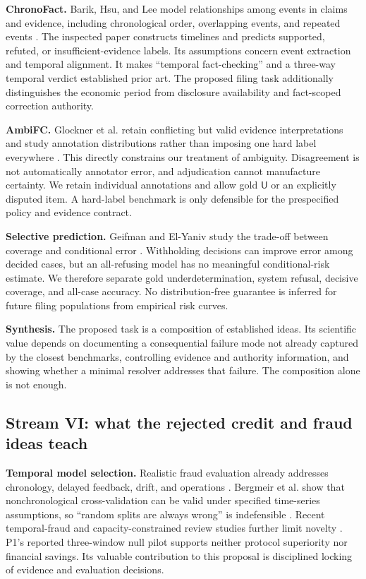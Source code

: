 \documentclass[11pt,a4paper]{article}
\newcommand{\pbreak}{\clearpage}
\newcommand{\lead}[1]{\textbf{\color{navy}#1}}
\newcommand{\Ulabel}{\mathsf{U}}
\begin{document}
\lead{ChronoFact.} Barik, Hsu, and Lee model relationships among events in claims and evidence, including chronological order, overlapping events, and repeated events \cite{chronofact}. The inspected paper constructs timelines and predicts supported, refuted, or insufficient-evidence labels. Its assumptions concern event extraction and temporal alignment. It makes “temporal fact-checking” and a three-way temporal verdict established prior art. The proposed filing task additionally distinguishes the economic period from disclosure availability and fact-scoped correction authority.

\lead{AmbiFC.} Glockner et al. retain conflicting but valid evidence interpretations and study annotation distributions rather than imposing one hard label everywhere \cite{ambifc}. This directly constrains our treatment of ambiguity. Disagreement is not automatically annotator error, and adjudication cannot manufacture certainty. We retain individual annotations and allow gold \(\Ulabel\) or an explicitly disputed item. A hard-label benchmark is only defensible for the prespecified policy and evidence contract.

\lead{Selective prediction.} Geifman and El-Yaniv study the trade-off between coverage and conditional error \cite{selective}. Withholding decisions can improve error among decided cases, but an all-refusing model has no meaningful conditional-risk estimate. We therefore separate gold underdetermination, system refusal, decisive coverage, and all-case accuracy. No distribution-free guarantee is inferred for future filing populations from empirical risk curves.

\lead{Synthesis.} The proposed task is a composition of established ideas. Its scientific value depends on documenting a consequential failure mode not already captured by the closest benchmarks, controlling evidence and authority information, and showing whether a minimal resolver addresses that failure. The composition alone is not enough.

\pbreak
\subsection{Stream VI: what the rejected credit and fraud ideas teach}
\lead{Temporal model selection.} Realistic fraud evaluation already addresses chronology, delayed feedback, drift, and operations \cite{dal2018}. Bergmeir et al. show that nonchronological cross-validation can be valid under specified time-series assumptions, so “random splits are always wrong” is indefensible \cite{bergmeir}. Recent temporal-fraud and capacity-constrained review studies further limit novelty \cite{zuberi,topk}. P1's reported three-window null pilot supports neither protocol superiority nor financial savings. Its valuable contribution to this proposal is disciplined locking of evidence and evaluation decisions.
\end{document}
